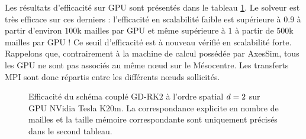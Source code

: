 Les résultats d'efficacité sur GPU sont présentés dans le tableau \ref{tab:scala_meso}.
Le solveur est très efficace sur ces derniers : l'efficacité en scalabilité faible
est supérieure à $0.9$ à partir d'environ $100$k mailles par GPU
et même supérieure à $1$ à partir de $500$k mailles par GPU !
Ce seuil d'efficacité est à nouveau vérifié en scalabilité forte.
Rappelons que, contrairement à la machine de calcul possédée par AxesSim,
tous les GPU ne sont pas associés au même nœud sur le Mésocentre.
Les transferts MPI sont donc répartis entre les différents nœuds sollicités.


\begin{figure}[!h]
	\begin{center}
		\caption{
			\label{tab:scala_meso}
			Efficacité du schéma couplé GD-RK$2$ à l'ordre spatial $d = 2$
			sur GPU NVidia Tesla K$20$m.
			La correspondance explicite en nombre de mailles et la taille mémoire
			correspondante sont uniquement précisés dans le second tableau.
		}
		

\end{center}
\end{figure}
